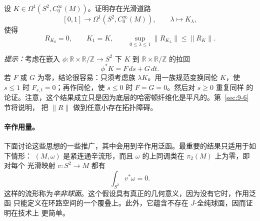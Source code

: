 \begin{exercise}\label{ex:9-1-5}
设 $K\in\Omega^1(S^2,C_0^\infty(M))$。证明存在光滑道路
\[
  [0,1]\longrightarrow\Omega^1(S^2,C_0^\infty(M)),\qquad
  \lambda\longmapsto K_\lambda,
\]
使得
\[
  R_{K_0}=0,\qquad K_1=K,\qquad
  \sup_{0\le\lambda\le1}\|R_{K_\lambda}\|\le\|R_K\|.
\]

\emph{提示：}考虑在嵌入
$\phi:\mathbb R\times\mathbb R/\mathbb Z\to S^2$ 下 $K$ 到
$\mathbb R\times\mathbb R/\mathbb Z$ 的拉回
\[
  \phi^*K=F\,ds+G\,dt.
\]
若 $F$ 或 $G$ 为零，结论很容易：只须考虑族 $\lambda K$。用一族规范变换同伦 $K$，使
$s\le1$ 时 $F_{s,t}=0$；再作同伦，使 $s\le0$ 时 $F=G=0$。然后对 $s\ge0$ 重复同样
的论证。注意，这个结果成立只是因为底层的哈密顿纤维化是平凡的。第~\ref{sec:9-6} 节将说明，
把 $\|R\|$ 做到任意小存在拓扑障碍。
\end{exercise}

\paragraph{辛作用量。}
下面讨论这些思想的一些推广，其中会用到辛作用泛函。最重要的结果只适用于如下情形：
$(M,\omega)$ 是紧连通辛流形，而且 $\omega$ 的上同调类在 $\pi_2(M)$ 上为零，即对每个
光滑映射 $v:S^2\to M$ 都有
\[
  \int_{S^2}v^*\omega=0.
\]
这样的流形称为\emph{辛非球面}。这个假设具有真正的几何意义，因为没有它时，作用泛函
只能定义在环路空间的一个覆叠上。此外，它蕴含不存在 $J$-全纯球面，因而证明在技术上
更简单。

